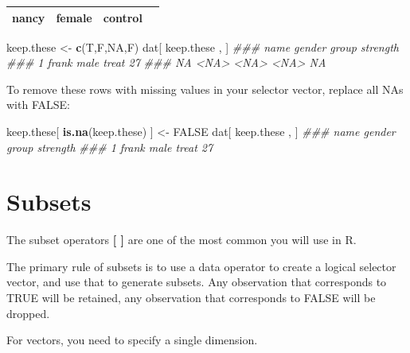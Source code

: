 \documentclass[]{book}
\newenvironment{Shaded}{\begin{snugshade}}{\end{snugshade}}
\newcommand{\CommentTok}[1]{\textcolor[rgb]{0.56,0.35,0.01}{\textit{#1}}}
\newcommand{\KeywordTok}[1]{\textcolor[rgb]{0.13,0.29,0.53}{\textbf{#1}}}
\newcommand{\NormalTok}[1]{#1}
\newcommand{\OtherTok}[1]{\textcolor[rgb]{0.56,0.35,0.01}{#1}}
\newcommand{\StringTok}[1]{\textcolor[rgb]{0.31,0.60,0.02}{#1}}
\theoremstyle{definition}
\theoremstyle{definition}
\theoremstyle{definition}
\theoremstyle{remark}
\begin{document}
\begin{longtable}[]{@{}cccc@{}}
\begin{minipage}[t]{0.11\columnwidth}\centering
nancy\strut
\end{minipage} & \begin{minipage}[t]{0.11\columnwidth}\centering
female\strut
\end{minipage} & \begin{minipage}[t]{0.12\columnwidth}\centering
control\strut
\end{minipage} & \begin{minipage}[t]{0.14\columnwidth}\centering
58\strut
\end{minipage}\tabularnewline
\bottomrule
\end{longtable}

\begin{Shaded}
\begin{Highlighting}[]
\NormalTok{keep.these <-}\StringTok{ }\KeywordTok{c}\NormalTok{(T,F,}\OtherTok{NA}\NormalTok{,F)}
\NormalTok{dat[ keep.these , ]}
\CommentTok{###     name gender group strength}
\CommentTok{### 1  frank   male treat       27}
\CommentTok{### NA  <NA>   <NA>  <NA>       NA}
\end{Highlighting}
\end{Shaded}

To remove these rows with missing values in your selector vector,
replace all NAs with FALSE:

\begin{Shaded}
\begin{Highlighting}[]
\NormalTok{keep.these[ }\KeywordTok{is.na}\NormalTok{(keep.these) ] <-}\StringTok{ }\OtherTok{FALSE}
\NormalTok{dat[ keep.these , ]}
\CommentTok{###    name gender group strength}
\CommentTok{### 1 frank   male treat       27}
\end{Highlighting}
\end{Shaded}

\hypertarget{subsets}{%
\section{Subsets}\label{subsets}}

The subset operators \textbf{{[} {]}} are one of the most common you
will use in R.

The primary rule of subsets is to use a data operator to create a
logical selector vector, and use that to generate subsets. Any
observation that corresponds to TRUE will be retained, any observation
that corresponds to FALSE will be dropped.

For vectors, you need to specify a single dimension.
\end{document}
